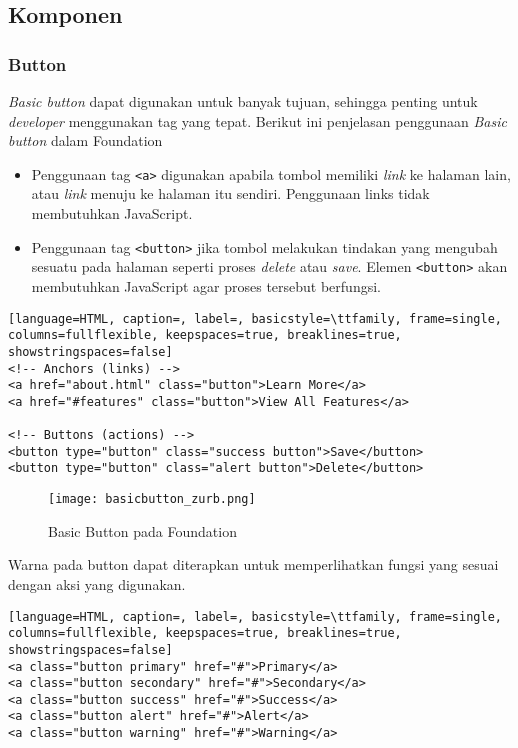 \subsection{Komponen}
 
\subsubsection{Button}
\textit{Basic button} dapat digunakan untuk banyak tujuan, sehingga penting untuk \textit{developer} menggunakan tag yang tepat. Berikut ini penjelasan penggunaan \textit{Basic button} dalam Foundation
\begin{itemize}
  \item Penggunaan tag \texttt{<a>} digunakan apabila tombol memiliki \textit{link} ke halaman lain, atau \textit{link} menuju ke halaman itu sendiri. Penggunaan links tidak membutuhkan JavaScript.
  \item Penggunaan tag \texttt{<button>} jika tombol melakukan tindakan yang mengubah sesuatu pada halaman seperti proses \textit{delete} atau \textit{save}. Elemen \texttt{<button>} akan membutuhkan JavaScript agar proses tersebut berfungsi. 
\end{itemize}

\begin{lstlisting}[language=HTML, caption=, label=, basicstyle=\ttfamily, frame=single, columns=fullflexible, keepspaces=true, breaklines=true, showstringspaces=false] 
<!-- Anchors (links) -->
<a href="about.html" class="button">Learn More</a>
<a href="#features" class="button">View All Features</a>

<!-- Buttons (actions) -->
<button type="button" class="success button">Save</button>
<button type="button" class="alert button">Delete</button>
\end{lstlisting}

\begin{figure} [H]
	\centering  
	\texttt{[image: basicbutton\_zurb.png]}  
	\caption{Basic Button pada Foundation}
\end{figure}

\noindent Warna pada button dapat diterapkan untuk memperlihatkan fungsi yang sesuai dengan aksi yang digunakan.
\begin{lstlisting}[language=HTML, caption=, label=, basicstyle=\ttfamily, frame=single, columns=fullflexible, keepspaces=true, breaklines=true, showstringspaces=false] 
<a class="button primary" href="#">Primary</a>
<a class="button secondary" href="#">Secondary</a>
<a class="button success" href="#">Success</a>
<a class="button alert" href="#">Alert</a>
<a class="button warning" href="#">Warning</a>
\end{lstlisting}

